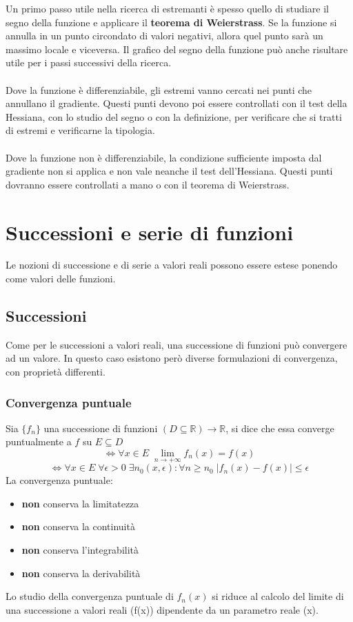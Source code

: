 \documentclass{article}
\newcommand{\R}{\mathds{R}}
\begin{document}
Un primo passo utile nella ricerca di estremanti è spesso quello di studiare il segno della funzione e applicare il \textbf{teorema di Weierstrass}. Se la funzione si annulla in un punto circondato di valori negativi, allora quel punto sarà un massimo locale e viceversa. Il grafico del segno della funzione può anche risultare utile per i passi successivi della ricerca.\\\\
Dove la funzione è differenziabile, gli estremi vanno cercati nei punti che annullano il gradiente. Questi punti devono poi essere controllati con il test della Hessiana, con lo studio del segno o con la definizione, per verificare che si tratti di estremi e verificarne la tipologia.\\\\
Dove la funzione non è differenziabile, la condizione sufficiente imposta dal gradiente non si applica e non vale neanche il test dell'Hessiana. Questi punti dovranno essere controllati a mano o con il teorema di Weierstrass.



\newpage
\section{Successioni e serie di funzioni}
Le nozioni di successione e di serie a valori reali possono essere estese ponendo come valori delle funzioni.

\subsection{Successioni}
Come per le successioni a valori reali, una successione di funzioni può convergere ad un valore. In questo caso esistono però diverse formulazioni di convergenza, con proprietà differenti.

\subsubsection{Convergenza puntuale}
Sia $\{f_n\}$ una successione di funzioni $(D\subseteq\R)\rightarrow\R$, si dice che essa converge puntualmente a $f$ su $E\subseteq D$
$$\Leftrightarrow \forall x\in E\; \lim_{n\rightarrow+\infty}f_n(x)=f(x) $$
$$ \Leftrightarrow \forall x\in E\; \forall\epsilon>0\; \exists n_0(x,\epsilon): \forall n\geq n_0\; |f_n(x)-f(x)|\leq\epsilon $$
La convergenza puntuale:
\begin{itemize}
    \item \textbf{non} conserva la limitatezza
    \item \textbf{non} conserva la continuità
    \item \textbf{non} conserva l'integrabilità
    \item \textbf{non} conserva la derivabilità
\end{itemize}
Lo studio della convergenza puntuale di $f_n(x)$ si riduce al calcolo del limite di una successione a valori reali (f(x)) dipendente da un parametro reale (x).
\end{document}
